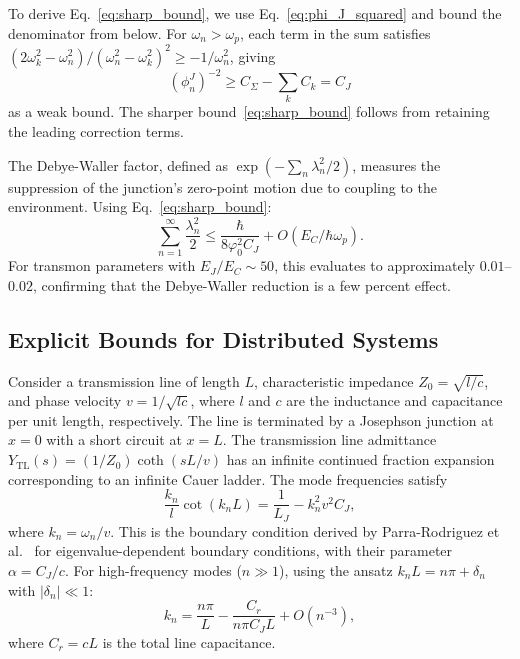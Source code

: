 \documentclass[reprint, floatfix, superscriptaddress, amsmath, amssymb, longbibliography]{revtex4-2}
\begin{document}
To derive Eq.~\eqref{eq:sharp_bound}, we use Eq.~\eqref{eq:phi_J_squared} and bound the denominator from below. For $\omega_n > \omega_p$, each term in the sum satisfies $(2\omega_k^2 - \omega_n^2)/(\omega_n^2 - \omega_k^2)^2 \geq -1/\omega_n^2$, giving
\begin{equation}
(\phi_n^J)^{-2} \geq C_\Sigma - \sum_k C_k = C_J
\end{equation}
as a weak bound. The sharper bound~\eqref{eq:sharp_bound} follows from retaining the leading correction terms.

The Debye-Waller factor, defined as $\exp(-\sum_n \lambda_n^2/2)$, measures the suppression of the junction's zero-point motion due to coupling to the environment. Using Eq.~\eqref{eq:sharp_bound}:
\begin{equation}
\sum_{n=1}^{\infty} \frac{\lambda_n^2}{2} \leq \frac{\hbar}{8\varphi_0^2 C_J} + O(E_C/\hbar\omega_p).
\label{eq:dw_total_bound}
\end{equation}
For transmon parameters with $E_J/E_C \sim 50$, this evaluates to approximately $0.01$--$0.02$, confirming that the Debye-Waller reduction is a few percent effect.

\subsection{Explicit Bounds for Distributed Systems}
\label{sec:analytic_bounds_distributed}

Consider a transmission line of length $L$, characteristic impedance $Z_0 = \sqrt{l/c}$, and phase velocity $v = 1/\sqrt{lc}$, where $l$ and $c$ are the inductance and capacitance per unit length, respectively. The line is terminated by a Josephson junction at $x = 0$ with a short circuit at $x = L$. The transmission line admittance $Y_{\mathrm{TL}}(s) = (1/Z_0)\coth(sL/v)$ has an infinite continued fraction expansion corresponding to an infinite Cauer ladder.
The mode frequencies satisfy
\begin{equation}
\frac{k_n}{l} \cot(k_n L) = \frac{1}{L_J} - k_n^2 v^2 C_J,
\label{eq:transcendental_distributed}
\end{equation}
where $k_n = \omega_n/v$. This is the boundary condition derived by Parra-Rodriguez et al.~\cite{ParraRodriguez2018} for eigenvalue-dependent boundary conditions, with their parameter $\alpha = C_J/c$. For high-frequency modes ($n \gg 1$), using the ansatz $k_n L = n\pi + \delta_n$ with $|\delta_n| \ll 1$:
\begin{equation}
k_n = \frac{n\pi}{L} - \frac{C_r}{n\pi C_J L} + O(n^{-3}),
\label{eq:kn_explicit}
\end{equation}
where $C_r = cL$ is the total line capacitance.
\end{document}
